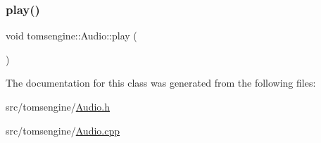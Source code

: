 \mbox{\label{classtomsengine_1_1_audio_af1d795d8302a2c23ee1307492f4ec705}} 
\subsubsection{\texorpdfstring{play()}{play()}\hspace{0.1cm}{\footnotesize\ttfamily [2/2]}}
{\footnotesize\ttfamily void tomsengine\+::\+Audio\+::play (\begin{DoxyParamCaption}{ }\end{DoxyParamCaption})}



The documentation for this class was generated from the following files\+:\begin{DoxyCompactItemize}
\item 
src/tomsengine/\mbox{\hyperlink{_audio_8h}{Audio.\+h}}\item 
src/tomsengine/\mbox{\hyperlink{_audio_8cpp}{Audio.\+cpp}}\end{DoxyCompactItemize}
